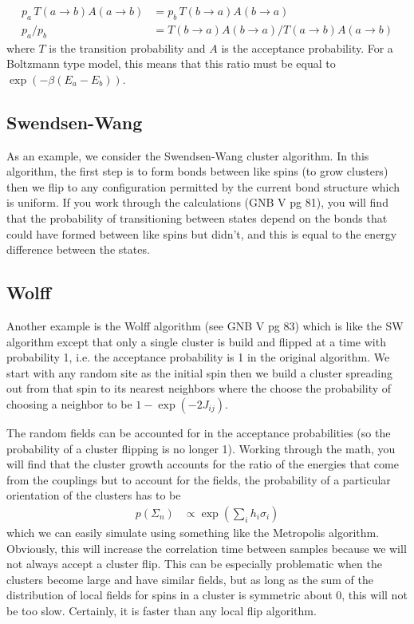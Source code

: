 \documentclass[11pt]{amsart}
\begin{document}
\begin{align}
	p_a\,T(a\rightarrow b)A(a\rightarrow b) &= p_b\,T(b\rightarrow a)A(b\rightarrow a)\\
	p_a/p_b &= T(b\rightarrow a)A(b\rightarrow a)/T(a\rightarrow b)A(a\rightarrow b)
\end{align}
where $T$ is the transition probability and $A$ is the acceptance probability. For a Boltzmann type model, this means that this ratio must be equal to $\exp(-\beta(E_a-E_b))$.

\subsection{Swendsen-Wang}
As an example, we consider the Swendsen-Wang cluster algorithm. In this algorithm, the first step is to form bonds between like spins (to grow clusters) then we flip to any configuration permitted by the current bond structure which is uniform. If you work through the calculations (GNB V pg 81), you will find that the probability of transitioning between states depend on the bonds that could have formed between like spins but didn't, and this is equal to the energy difference between the states.

\subsection{Wolff}
Another example is the Wolff algorithm (see GNB V pg 83) which is like the SW algorithm except that only a single cluster is build and flipped at a time with probability 1, i.e. the acceptance probability is 1 in the original algorithm. We start with any random site as the initial spin then we build a cluster spreading out from that spin to its nearest neighbors where the choose the probability of choosing a neighbor to be $1-\exp(-2J_{ij})$.

The random fields can be accounted for in the acceptance probabilities (so the probability of a cluster flipping is no longer 1). Working through the math, you will find that the cluster growth accounts for the ratio of the energies that come from the couplings but to account for the fields, the probability of a particular orientation of the clusters has to be
\begin{align}
	p(\Sigma_n) &\propto \exp\left(\sum_i h_i\sigma_i\right)
\end{align}
which we can easily simulate using something like the Metropolis algorithm. Obviously, this will increase the correlation time between samples because we will not always accept a cluster flip. This can be especially problematic when the clusters become large and have similar fields, but as long as the sum of the distribution of local fields for spins in a cluster is symmetric about 0, this will not be too slow. Certainly, it is faster than any local flip algorithm.
\end{document}
